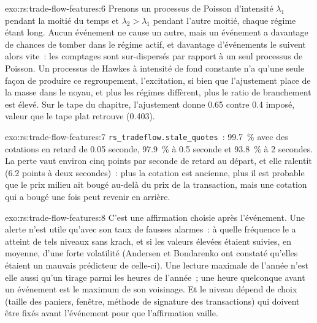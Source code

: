 \begin{solution}{exo:rs:trade-flow-features:6}
Prenons un processus de Poisson d'intensité $\lambda_1$ pendant la moitié du temps et $\lambda_2 > \lambda_1$ pendant l'autre moitié, chaque régime étant long. Aucun événement ne
cause un autre, mais un événement a davantage de chances de tomber dans le régime actif, et davantage d'événements le suivent alors vite~: les comptages sont sur-dispersés
par rapport à un seul processus de Poisson. Un processus de Hawkes à intensité de fond constante n'a qu'une seule façon de produire ce regroupement, l'excitation, si bien que
l'ajustement place de la masse dans le noyau, et plus les régimes diffèrent, plus le ratio de branchement est élevé. Sur le tape du chapitre, l'ajustement donne 0.65
contre 0.4 imposé, valeur que le tape plat retrouve (0.403).
\end{solution}

\begin{solution}{exo:rs:trade-flow-features:7}
\texttt{rs\_tradeflow.stale\_quotes}~: 99.7~\% avec des cotations en retard de 0.05 seconde, 97.9~\% à 0.5 seconde et 93.8~\% à 2 secondes. La perte vaut environ
cinq points par seconde de retard au départ, et elle ralentit (6.2 points à deux secondes)~: plus la cotation est ancienne, plus il est probable que le prix milieu ait bougé
au-delà du prix de la transaction, mais une cotation qui a bougé une fois peut revenir en arrière.
\end{solution}

\begin{solution}{exo:rs:trade-flow-features:8}
C'est une affirmation choisie après l'événement. Une alerte n'est utile qu'avec son taux de fausses alarmes~: à quelle fréquence le  a atteint de tels niveaux sans krach,
et si les valeurs élevées étaient suivies, en moyenne, d'une forte volatilité (Andersen et Bondarenko ont constaté qu'elles étaient un mauvais prédicteur de celle-ci). Une
lecture maximale de l'année n'est elle aussi qu'un tirage parmi les heures de l'année~; une heure quelconque avant un événement est le maximum de son voisinage. Et le
niveau dépend de choix (taille des paniers, fenêtre, méthode de signature des transactions) qui doivent être fixés avant l'événement pour que l'affirmation vaille.
\end{solution}


